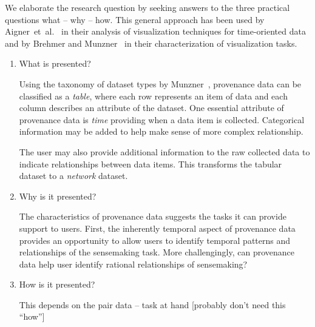 %

We elaborate the research question by seeking answers to the three practical questions what -- why -- how. This general approach has been used by Aigner~et~al.~\cite{Aigner2011} in their analysis of visualization techniques for time-oriented data and by Brehmer and Munzner~\cite{Brehmer2013} in their characterization of visualization tasks.



\begin{enumerate}
	\item What is presented?
	
	Using the taxonomy of dataset types by Munzner~\cite{Munzner2014}, provenance data can be classified as a \emph{table}, where each row represents an item of data and each column describes an attribute of the dataset. One essential attribute of provenance data is \emph{time} providing when a data item is collected. Categorical information may be added to help make sense of more complex relationship.
	
	The user may also provide additional information to the raw collected data to indicate relationships between data items. This transforms the tabular dataset to a \emph{network} dataset.
	
	\item Why is it presented?
	
	The characteristics of provenance data suggests the tasks it can provide support to users. First, the inherently temporal aspect of provenance data provides an opportunity to allow users to identify temporal patterns and relationships of the sensemaking task. More challengingly, can provenance data help user identify rational relationships of sensemaking?
	
	\item How is it presented?
	
	This depends on the pair data -- task at hand [probably don't need this ``how'']
\end{enumerate}

